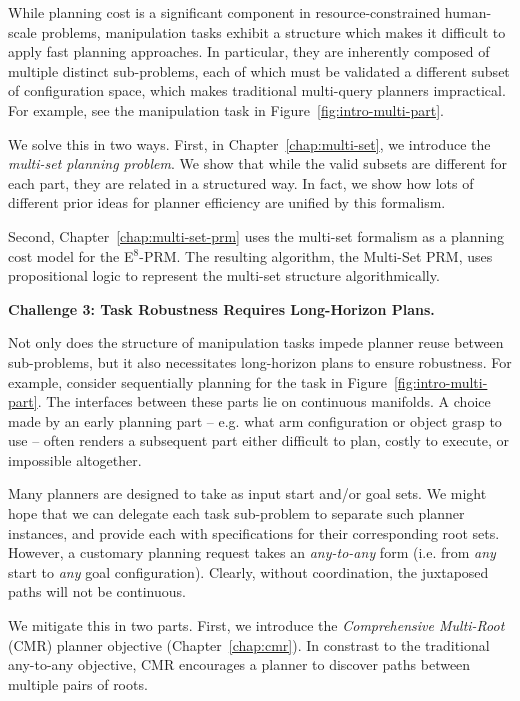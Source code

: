 While planning cost is a significant component
in resource-constrained human-scale problems,
manipulation tasks exhibit a structure
which makes it difficult to apply fast planning approaches.
In particular,
they are inherently composed of multiple distinct sub-problems,
each of which 
must be validated a different subset of configuration space,
which makes traditional multi-query planners impractical.
For example, see the manipulation task in
Figure~\ref{fig:intro-multi-part}.

We solve this in two ways.
First, in Chapter~\ref{chap:multi-set},
we introduce the \emph{multi-set planning problem}.
We show that while the valid subsets are different for each part,
they are related in a structured way.
In fact, we show how lots of different prior ideas for planner
efficiency are unified by this formalism.

Second, Chapter~\ref{chap:multi-set-prm}
uses the multi-set formalism as a planning cost model
for the E$^8$-PRM.
The resulting algorithm,
the Multi-Set PRM,
uses propositional logic to represent the multi-set structure
algorithmically.

\textbf{Challenge 3: Task Robustness Requires Long-Horizon Plans.}

Not only does the structure of manipulation tasks
impede planner reuse between sub-problems,
but it also necessitates long-horizon plans to ensure robustness.
For example,
consider sequentially planning for the task in
Figure~\ref{fig:intro-multi-part}.
The interfaces between these parts lie on continuous manifolds.
A choice made by an early planning part
-- e.g. what arm configuration or object grasp to use --
often renders a subsequent part either difficult to plan,
costly to execute, or impossible altogether.

Many planners are designed to take as input start and/or goal sets.
We might hope that we can delegate each task sub-problem to
separate such planner instances,
and provide each with specifications for their corresponding
root sets.
However,
a customary planning request takes an \emph{any-to-any} form
(i.e. from \emph{any} start to \emph{any} goal configuration).
Clearly, without coordination,
the juxtaposed paths will not be continuous.

We mitigate this in two parts.
First, we introduce the \emph{Comprehensive Multi-Root} (CMR) planner
objective (Chapter~\ref{chap:cmr}).
In constrast to the traditional any-to-any objective,
CMR encourages a planner to discover paths between multiple pairs of
roots.

